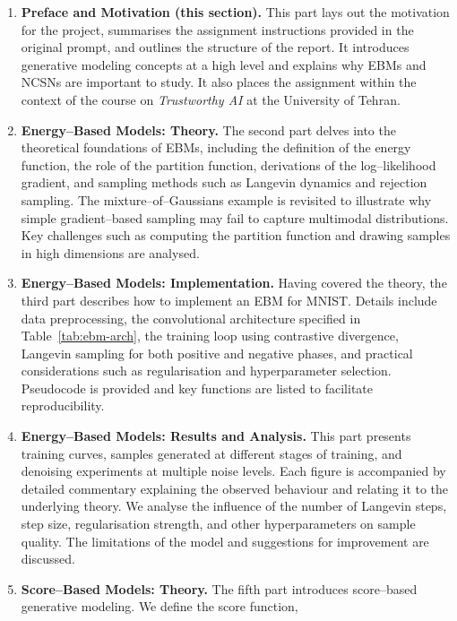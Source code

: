 \begin{enumerate}[leftmargin=*,label=\arabic*.]
  \item \textbf{Preface and Motivation (this section).}  This part lays out
    the motivation for the project, summarises the assignment instructions
    provided in the original prompt, and outlines the structure of the
    report.  It introduces generative modeling concepts at a high level and
    explains why EBMs and NCSNs are important to study.  It also places the
    assignment within the context of the course on \emph{Trustworthy AI} at
    the University of Tehran.
  \item \textbf{Energy–Based Models: Theory.}  The second part delves into
    the theoretical foundations of EBMs, including the definition of the
    energy function, the role of the partition function, derivations of the
    log–likelihood gradient, and sampling methods such as Langevin dynamics
    and rejection sampling.  The mixture–of–Gaussians example is revisited
    to illustrate why simple gradient–based sampling may fail to capture
    multimodal distributions.  Key challenges such as computing the
    partition function and drawing samples in high dimensions are analysed.
  \item \textbf{Energy–Based Models: Implementation.}  Having covered the
    theory, the third part describes how to implement an EBM for MNIST.
    Details include data preprocessing, the convolutional architecture
    specified in Table~\ref{tab:ebm-arch}, the training loop using contrastive
    divergence, Langevin sampling for both positive and negative phases, and
    practical considerations such as regularisation and hyperparameter
    selection.  Pseudocode is provided and key functions are listed to
    facilitate reproducibility.
  \item \textbf{Energy–Based Models: Results and Analysis.}  This part
    presents training curves, samples generated at different stages of
    training, and denoising experiments at multiple noise levels.  Each
    figure is accompanied by detailed commentary explaining the observed
    behaviour and relating it to the underlying theory.  We analyse the
    influence of the number of Langevin steps, step size, regularisation
    strength, and other hyperparameters on sample quality.  The limitations
    of the model and suggestions for improvement are discussed.
  \item \textbf{Score–Based Models: Theory.}  The fifth part introduces
    score–based generative modeling.  We define the score function,

\end{enumerate}
